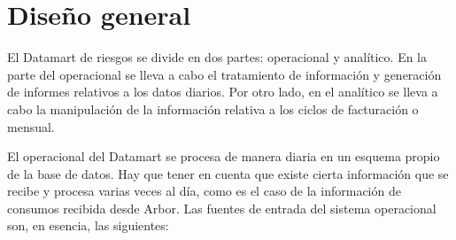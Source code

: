 \documentclass[a4paper, 12pt]{book}
\begin{document}
\section{Diseño general} 
\label{sec:diseno}
El Datamart de riesgos se divide en dos partes: operacional y analítico. En la parte del operacional se lleva a cabo el tratamiento de información y generación de informes relativos a los datos diarios. Por otro lado, en el analítico se lleva a cabo la manipulación de la información relativa a los ciclos de facturación o mensual.

El operacional del Datamart se procesa de manera diaria en un esquema propio de la base de datos. Hay que tener en cuenta que existe cierta información que se recibe y procesa varias veces al día, como es el caso de la información de consumos recibida desde Arbor. Las fuentes de entrada del sistema operacional son, en esencia, las siguientes:
\end{document}
